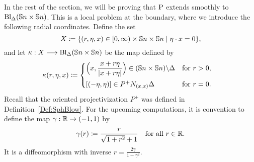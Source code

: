 \documentclass[\MainFolder/Text.tex]{subfiles}
\begin{document}
In the rest of the section, we will be proving that $\mathrm{P}$ extends smoothly to $\mathrm{Bl}_{\Delta}(\mathbb{S}{n}\times \mathbb{S}{n})$. This is a local problem at the boundary, where we introduce the following radial coordinates. Define the set
\[ X \coloneqq \{(r,\eta,x)\in [0,\infty)\times \mathbb{S}{n}\times\mathbb{S}{n} \mid \eta\cdot x = 0\}, \]
and let $\kappa: X \longrightarrow \mathrm{Bl}_\Delta(\mathbb{S}{n}\times \mathbb{S}{n})$ be the map defined by
\begin{align*}
\kappa(r,\eta,x) &\coloneqq \begin{cases} 
\Bigl(x,\dfrac{x+r\eta}{|x+r\eta|}\Bigr)\in (\mathbb{S}{n}\times \mathbb{S}{n})\backslash \Delta & \text{for }r>0, \\[2ex]
[(-\eta,\eta)]\in P^+ N_{(x,x)}\Delta & \text{for }r=0.
\end{cases}
\end{align*}
Recall that the oriented projectivization $P^+$ was defined in Definition~\ref{Def:SphBlow}.
For the upcoming computations, it is convention to define the map $\gamma: \mathbb{R} \rightarrow (-1,1)$ by
\[ \gamma(r) \coloneqq \frac{r}{\sqrt{1+r^2}+1} \quad\text{for all }r\in \mathbb{R}. \]
It is a diffeomorphism with inverse $r = \frac{2 \gamma}{1-\gamma^2}$.
\end{document}
